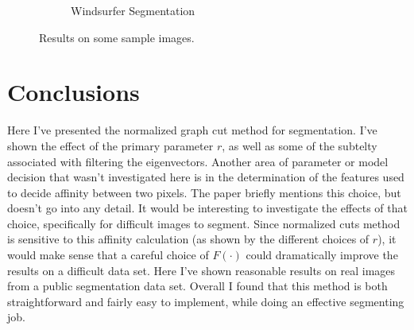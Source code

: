 \documentclass[11pt]{article}
\begin{document}
\begin{figure}
\begin{subfigure}[b]{0.4\textwidth}
\caption{Windsurfer Segmentation}
\label{fig:res:ws}
\end{subfigure}
\caption{Results on some sample images.}
\label{fig:results}
\end{figure}

\section{Conclusions}

Here I've presented the normalized graph cut method for segmentation.
I've shown the effect of the primary parameter $r$, as well as some of the subtelty associated with filtering the eigenvectors.
Another area of parameter or model decision that wasn't investigated here is in the determination of the features used to decide affinity between two pixels.
The paper briefly mentions this choice, but doesn't go into any detail.
It would be interesting to investigate the effects of that choice, specifically for difficult images to segment.
Since normalized cuts method is sensitive to this affinity calculation (as shown by the different choices of $r$), it would make sense that a careful choice of $F(\cdot)$ could dramatically improve the results on a difficult data set.
Here I've shown reasonable results on real images from a public segmentation data set.
Overall I found that this method is both straightforward and fairly easy to implement, while doing an effective segmenting job.


\end{document}
